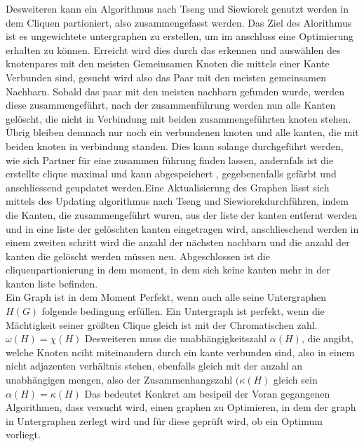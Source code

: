 \documentclass[conference]{IEEEtran}
\begin{document}
Desweiteren kann ein Algorithmus nach Tseng und Siewiorek genutzt werden in dem Cliquen partioniert, also zusammengefasst werden. Das Ziel des Alorithmus ist es ungewichtete untergraphen zu erstellen, um im anschluss eine Optimierung erhalten zu können\cite[S. 247]{3}.
Erreicht wird dies durch das erkennen und auswählen des knotenpares mit den meisten Gemeinsamen Knoten die mittels einer Kante Verbunden sind, gesucht wird also das Paar mit den meisten gemeinsamen Nachbarn. Sobald das paar mit den meisten nachbarn gefunden wurde, werden diese zusammengeführt, nach der zusammenführung werden nun alle Kanten gelöscht, die nicht in Verbindung mit beiden zusammengeführten knoten stehen. Übrig bleiben demnach nur noch ein verbundenen knoten und alle kanten, die mit beiden knoten in verbindung standen. Dies kann solange durchgeführt werden, wie sich Partner für eine zusammen führung finden lassen, andernfals ist die erstellte clique maximal und kann abgespeichert , gegebenenfalls gefärbt und anschliessend geupdatet werden.Eine Aktualisierung des Graphen lässt sich mittels des Updating algorithmus nach Tseng und Siewiorek\cite[S.393]{5}durchführen, indem die Kanten, die zusammengeführt wuren, aus der liste der kanten entfernt werden und in eine liste der gelöschten kanten eingetragen wird, anschlieschend werden in einem zweiten schritt wird die anzahl der nächsten nachbarn und die anzahl der kanten die gelöscht werden müssen neu. 
 Abgeschlossen ist die cliquenpartionierung in dem moment, in dem sich keine kanten mehr in der kanten liste befinden\cite[S.248]{3}\cite[S.392-393]{5}.\\
Ein Graph ist in dem Moment Perfekt, wenn auch alle seine Untergraphen $H(G)$ folgende bedingung erfüllen. Ein Untergraph ist perfekt, wenn die Mächtigkeit seiner größten Clique gleich ist mit der Chromatischen zahl. $\omega(H) = \chi(H)$ Desweiteren muss die unabhängigkeitszahl $ \alpha(H)$, die angibt, welche Knoten nciht miteinandern durch ein kante verbunden sind, also in einem nicht adjazenten verhältnis stehen, ebenfalls gleich mit der anzahl an unabhängigen mengen, also der Zusammenhangszahl $(\kappa(H)$ gleich sein $\alpha(H) = \kappa(H)$\cite[S.507]{1}\cite[S.59 - 60 ]{6} Das bedeutet Konkret am besipeil der Voran gegangenen Algorithmen, dass versucht wird, einen graphen zu Optimieren, in dem der graph in Untergraphen zerlegt wird und für diese geprüft wird, ob ein Optimum vorliegt.
\end{document}
